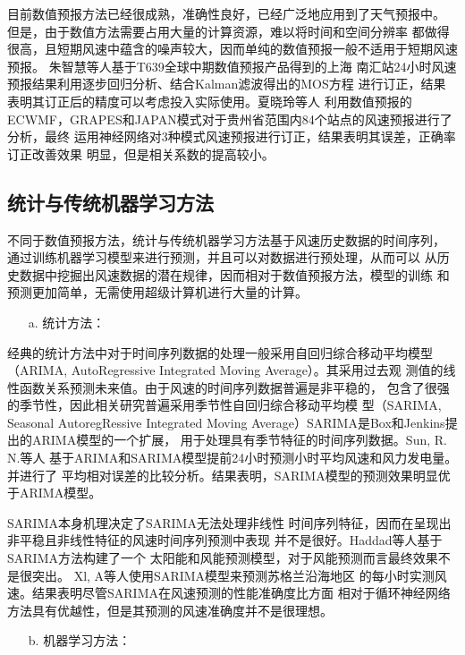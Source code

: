 \documentclass[AutoFakeBold]{LZUThesis}
\begin{document}
目前数值预报方法已经很成熟，准确性良好，已经广泛地应用到了天气预报中。
但是，由于数值方法需要占用大量的计算资源，难以将时间和空间分辨率
都做得很高，且短期风速中蕴含的噪声较大，因而单纯的数值预报一般不适用于短期风速预报。
朱智慧等人\cite{朱智慧2010T639}基于T639全球中期数值预报产品得到的上海
南汇站24小时风速预报结果利用逐步回归分析、结合Kalman滤波得出的MOS方程
进行订正，结果表明其订正后的精度可以考虑投入实际使用。夏晓玲等人
\cite{夏晓玲2019贵州省数值预报风速产品检验及订正}利用数值预报的
ECWMF，GRAPES和JAPAN模式对于贵州省范围内84个站点的风速预报进行了分析，最终
运用神经网络对3种模式风速预报进行订正，结果表明其误差，正确率订正改善效果
明显，但是相关系数的提高较小。

\subsection{统计与传统机器学习方法}
不同于数值预报方法，统计与传统机器学习方法基于风速历史数据的时间序列，
通过训练机器学习模型来进行预测，并且可以对数据进行预处理，从而可以
从历史数据中挖掘出风速数据的潜在规律，因而相对于数值预报方法，模型的训练
和预测更加简单，无需使用超级计算机进行大量的计算。

\begin{itemize}
\item[a. ] 统计方法：
\end{itemize}

经典的统计方法中对于时间序列数据的处理一般采用自回归综合移动平均模型
（ARIMA, AutoRegressive Integrated Moving Average）。其采用过去观
测值的线性函数关系预测未来值。由于风速的时间序列数据普遍是非平稳的，
包含了很强的季节性，因此相关研究普遍采用季节性自回归综合移动平均模
型（SARIMA, Seasonal AutoregRessive Integrated 
Moving Average）SARIMA是Box和Jenkins提出的ARIMA模型的一个扩展，
用于处理具有季节特征的时间序列数据。Sun, R. N.等人\cite{2017Forecast}
基于ARIMA和SARIMA模型提前24小时预测小时平均风速和风力发电量。并进行了
平均相对误差的比较分析。结果表明，SARIMA模型的预测效果明显优于ARIMA模型。

SARIMA本身机理决定了SARIMA无法处理非线性
时间序列特征，因而在呈现出非平稳且非线性特征的风速时间序列预测中表现
并不是很好。Haddad等人\cite{haddad2019wind}基于SARIMA方法构建了一个
太阳能和风能预测模型，对于风能预测而言最终效果不是很突出。
Xl, A等人\cite{2021Short}使用SARIMA模型来预测苏格兰沿海地区
的每小时实测风速。结果表明尽管SARIMA在风速预测的性能准确度比方面
相对于循环神经网络方法具有优越性，但是其预测的风速准确度并不是很理想。

\begin{itemize}
\item[b. ] 机器学习方法：
\end{itemize}
 
\end{document}
